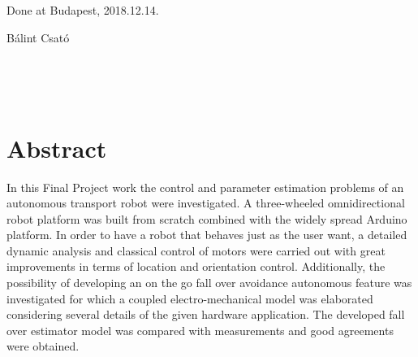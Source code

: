 \documentclass[12pt,english,twoside]{article}
\begin{document}
Done at Budapest, 2018.12.14.\\[8mm]

\begin{flushright}
	Bálint Csató
\end{flushright}
\thispagestyle{empty}
\newpage

\thispagestyle{empty}
$~$
\newpage

\renewcommand{\contentsname}{Contents}
\renewcommand{\cftsecleader}{\cftdotfill{\cftdotsep}}
\tableofcontents
{} %
\thispagestyle{empty}
\newpage

\thispagestyle{empty}
$~$
\newpage

\section*{Abstract}
In this Final Project work the control and parameter estimation problems of an autonomous transport robot were investigated. A three-wheeled omnidirectional robot platform was built from scratch combined with the widely spread Arduino platform. In order to have a robot that behaves just as the user want, a detailed dynamic analysis and classical control of motors were carried out with great improvements in terms of location and orientation control. Additionally, the possibility of developing an on the go fall over avoidance autonomous feature was investigated for which a coupled electro-mechanical model was elaborated considering several details of the given hardware application. The developed fall over estimator model was compared with measurements and good agreements were obtained.
\newpage

\thispagestyle{empty}
$~$
\newpage
\end{document}
